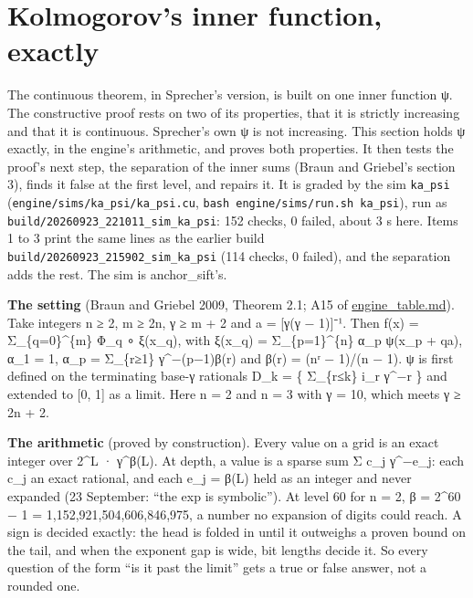 \section{\texorpdfstring{Kolmogorov's inner function, exactly}{Kolmogorov's inner function, exactly}}

The continuous theorem, in Sprecher's version, is built on one inner function ψ. The constructive proof rests on two of its properties, that it is strictly increasing and that it is continuous. Sprecher's own ψ is not increasing. This section holds ψ exactly, in the engine's arithmetic, and proves both properties. It then tests the proof's next step, the separation of the inner sums (Braun and Griebel's section 3), finds it false at the first level, and repairs it. It is graded by the sim \texttt{ka\_\allowbreak{}psi} (\texttt{engine/\allowbreak{}sims/\allowbreak{}ka\_\allowbreak{}psi/\allowbreak{}ka\_\allowbreak{}psi.\allowbreak{}cu}, \texttt{bash engine/\allowbreak{}sims/\allowbreak{}run.\allowbreak{}sh ka\_\allowbreak{}psi}), run as \texttt{build/\allowbreak{}20260923\_\allowbreak{}221011\_\allowbreak{}sim\_\allowbreak{}ka\_\allowbreak{}psi}: 152 checks, 0 failed, about 3 s here. Items 1 to 3 print the same lines as the earlier build \texttt{build/\allowbreak{}20260923\_\allowbreak{}215902\_\allowbreak{}sim\_\allowbreak{}ka\_\allowbreak{}psi} (114 checks, 0 failed), and the separation adds the rest. The sim is anchor\_\allowbreak{}sift's.

\textbf{The setting} (Braun and Griebel 2009, Theorem 2.1; A15 of \hyperref[chap:engine-table]{engine\_\allowbreak{}table.md}). Take integers n ≥ 2, m ≥ 2n, γ ≥ m + 2 and a = [γ(γ − 1)]⁻¹. Then f(x) = Σ\_\allowbreak{}\{q=0\}\textasciicircum{}\{m\} Φ\_\allowbreak{}q ∘ ξ(x\_\allowbreak{}q), with ξ(x\_\allowbreak{}q) = Σ\_\allowbreak{}\{p=1\}\textasciicircum{}\{n\} α\_\allowbreak{}p ψ(x\_\allowbreak{}p + qa), α\_\allowbreak{}1 = 1, α\_\allowbreak{}p = Σ\_\allowbreak{}\{r≥1\} γ\textasciicircum{}−(p−1)β(r) and β(r) = (nʳ − 1)/(n − 1). ψ is first defined on the terminating base-γ rationals D\_\allowbreak{}k = \{ Σ\_\allowbreak{}\{r≤k\} i\_\allowbreak{}r γ\textasciicircum{}−r \} and extended to [0, 1] as a limit. Here n = 2 and n = 3 with γ = 10, which meets γ ≥ 2n + 2.

\textbf{The arithmetic} (proved by construction). Every value on a grid is an exact integer over 2\textasciicircum{}L · γ\textasciicircum{}β(L). At depth, a value is a sparse sum Σ c\_\allowbreak{}j γ\textasciicircum{}−e\_\allowbreak{}j: each c\_\allowbreak{}j an exact rational, and each e\_\allowbreak{}j = β(L) held as an integer and never expanded (23 September: “the exp is symbolic”). At level 60 for n = 2, β = 2\textasciicircum{}60 − 1 = 1,152,921,504,606,846,975, a number no expansion of digits could reach. A sign is decided exactly: the head is folded in until it outweighs a proven bound on the tail, and when the exponent gap is wide, bit lengths decide it. So every question of the form “is it past the limit” gets a true or false answer, not a rounded one.

